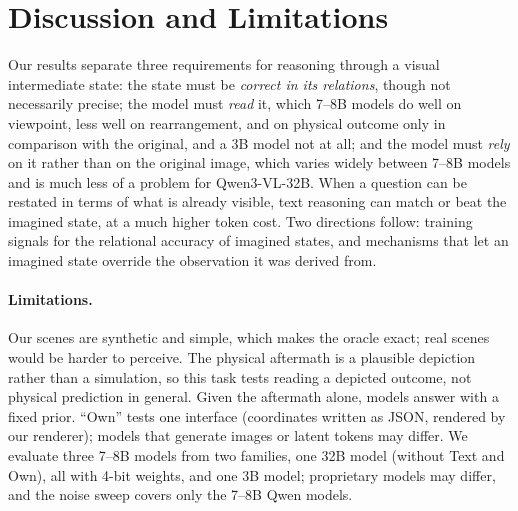 \section{Discussion and Limitations}
\label{sec:discussion}

Our results separate three requirements for reasoning through a visual intermediate state: the state must be \emph{correct in its relations}, though not necessarily precise; the model must \emph{read} it, which 7--8B models do well on viewpoint, less well on rearrangement, and on physical outcome only in comparison with the original, and a 3B model not at all; and the model must \emph{rely} on it rather than on the original image, which varies widely between 7--8B models and is much less of a problem for Qwen3-VL-32B. When a question can be restated in terms of what is already visible, text reasoning can match or beat the imagined state, at a much higher token cost. Two directions follow: training signals for the relational accuracy of imagined states, and mechanisms that let an imagined state override the observation it was derived from.

\paragraph{Limitations.} Our scenes are synthetic and simple, which makes the oracle exact; real scenes would be harder to perceive. The physical aftermath is a plausible depiction rather than a simulation, so this task tests reading a depicted outcome, not physical prediction in general. Given the aftermath alone, models answer with a fixed prior. ``Own'' tests one interface (coordinates written as JSON, rendered by our renderer); models that generate images or latent tokens may differ. We evaluate three 7--8B models from two families, one 32B model (without Text and Own), all with 4-bit weights, and one 3B model; proprietary models may differ, and the noise sweep covers only the 7--8B Qwen models.
